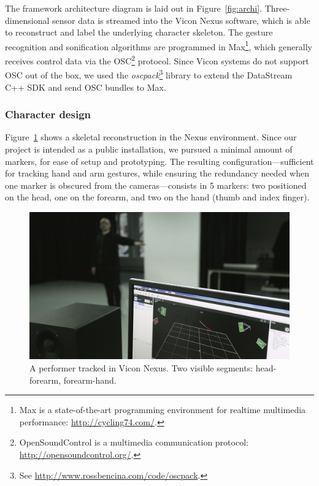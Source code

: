 \documentclass{nime-alternate}
\begin{document}
The framework architecture diagram is laid out in Figure~\ref{fig:archi}. Three-dimensional sensor data is streamed into the Vicon Nexus software, which is able to reconstruct and label the underlying character skeleton. The gesture recognition and sonification algorithms are programmed in Max\footnote{Max is a state-of-the-art programming environment for realtime multimedia performance: \url{http://cycling74.com/}.}, which generally receives control data via the OSC\footnote{OpenSoundControl is a multimedia communication protocol: \url{http://opensoundcontrol.org/}.} protocol. Since Vicon systems do not support OSC out of the box, we used the \textit{oscpack}\footnote{See \url{http://www.rossbencina.com/code/oscpack}.} library to extend the DataStream C++ SDK and send OSC bundles to Max.


\subsubsection{Character design}

Figure~\ref{fig:nexus} shows a skeletal reconstruction in the Nexus environment. Since our project is intended as a public installation, we pursued a minimal amount of markers, for ease of setup and prototyping. The resulting configuration---sufficient for tracking hand and arm gestures, while ensuring the redundancy needed when one marker is obscured from the cameras---consists in 5 markers: two positioned on the head, one on the forearm, and two on the hand (thumb and index finger).

\begin{figure}[ht]
	\centering
	\includegraphics[width=\columnwidth, clip, trim={12cm 0 0 0}]{img/nexus}
	\caption{A performer tracked in Vicon Nexus. Two visible segments: head-forearm, forearm-hand.}
	\label{fig:nexus}
\end{figure}
\end{document}
